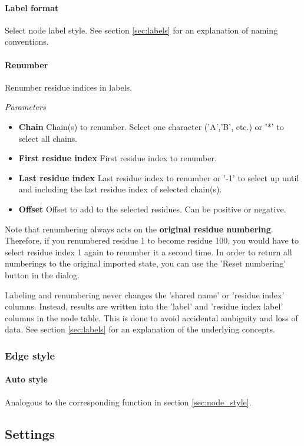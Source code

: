 \paragraph{Label format} Select node label style. See section \ref{sec:labels} for an explanation of naming conventions. 
\paragraph{Renumber} Renumber residue indices in labels.

\textit{Parameters}
\begin{itemize}
\item \textbf{Chain} Chain(s) to renumber. Select one character ('A','B', etc.) or '*' to select all chains.
\item \textbf{First residue index} First residue index to renumber.
\item \textbf{Last residue index} Last residue index to renumber or '-1' to select up until and including the last residue index of selected chain(s).
\item \textbf{Offset} Offset to add to the selected residues. Can be positive or negative.
\end{itemize}

Note that renumbering always acts on the \textbf{original residue numbering}. Therefore, if you renumbered residue 1 to become residue 100, you would have to select residue index 1 again to renumber it a second time. In order to return all numberings to the original imported state, you can use the 'Reset numbering' button in the dialog.

Labeling and renumbering never changes the 'shared name' or 'residue index' columns. Instead, results are written into the 'label' and 'residue index label' columns in the node table. This is done to avoid accidental ambiguity and loss of data. See section \ref{sec:labels} for an explanation of the underlying concepts.

\subsubsection{Edge style}

\paragraph{Auto style} Analogous to the corresponding function in section \ref{sec:node_style}.

\subsection{Settings}

